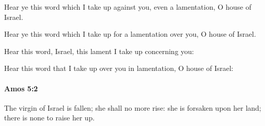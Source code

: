 			Hear ye this word which I take up against you, even a lamentation, O house of Israel.

			\begin{versebox}
					\item[BHS] 
					\item[LXX] 
					\item[ASV] Hear ye this word which I take up for a lamentation over you, O house of Israel.
					\item[NIV] Hear this word, Israel, this lament I take up concerning you:
					\item[NRSV] Hear this word that I take up over you in lamentation, O house of Israel:
			\end{versebox}

		\paragraph{Amos 5:2} %
			\label{AMOS-5-2}

			The virgin of Israel is fallen; she shall no more rise: she is forsaken upon her land; there is none to raise her up.

